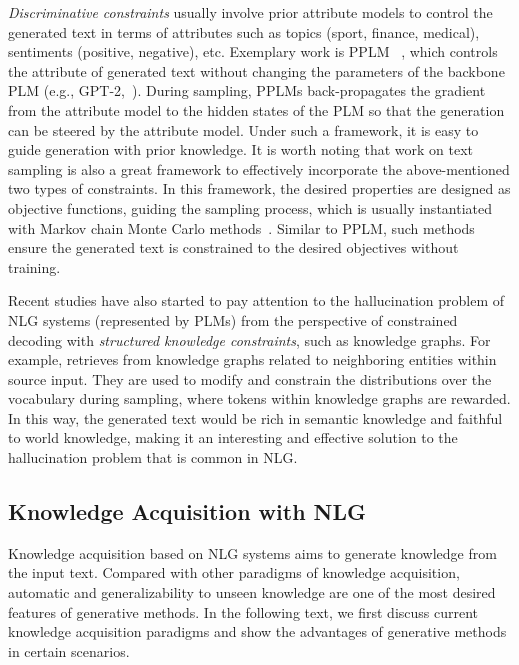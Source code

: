 \textit{Discriminative constraints} usually involve prior attribute models to control the generated text in terms of attributes such as topics (sport, finance, medical), sentiments (positive, negative), etc.
Exemplary work is PPLM ~\cite{Dathathri2020Plug}, which controls the attribute of generated text without changing the parameters of the backbone PLM (e.g., GPT-2,~\cite{radford2019language}).
During sampling, PPLMs back-propagates the gradient from the attribute model to the hidden states of the PLM so that the generation can be steered by the attribute model.
Under such a framework, it is easy to guide generation with prior knowledge.
It is worth noting that work on text sampling is also a great framework to effectively incorporate the above-mentioned two types of constraints.
In this framework, the desired properties are designed as objective functions, guiding the sampling process, which is usually instantiated with Markov chain Monte Carlo methods~\cite{Miao_Zhou_Mou_Yan_Li_2019,zhang-etal-2020-language-generation,qin2022cold}.
Similar to PPLM, such methods ensure the generated text is constrained to the desired objectives without training.


Recent studies have also started to pay attention to the hallucination problem of NLG systems (represented by PLMs) from the perspective of constrained decoding with \textit{structured knowledge constraints}, such as knowledge graphs.
For example, \cite{liu2022knowledge} retrieves from knowledge graphs related to neighboring entities within source input.
They are used to modify and constrain the distributions over the vocabulary during sampling, where tokens within knowledge graphs are rewarded.
In this way, the generated text would be rich in semantic knowledge and faithful to world knowledge, making it an interesting and effective solution to the hallucination problem that is common in NLG.



\subsection{Knowledge Acquisition with NLG}
\label{subsec:generative_acquisition}
Knowledge acquisition based on NLG systems aims to generate knowledge from the input text.
Compared with other paradigms of knowledge acquisition, automatic and generalizability to unseen knowledge are one of the most desired features of generative methods.
In the following text, we first discuss current knowledge acquisition paradigms and show the advantages of generative methods in certain scenarios.

